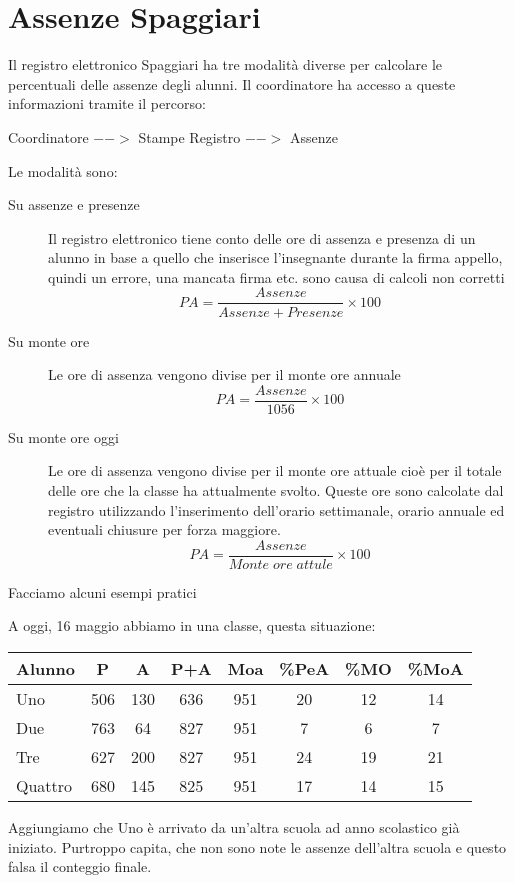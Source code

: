 \documentclass{article}
\begin{document}
\section*{Assenze Spaggiari}
Il registro elettronico Spaggiari  ha tre modalità diverse per calcolare le percentuali delle assenze degli alunni. Il coordinatore ha accesso a queste informazioni tramite il percorso:

Coordinatore $-->$ Stampe Registro $-->$ Assenze 

Le modalità sono:
\begin{description}
	\item[Su assenze e presenze] Il registro elettronico tiene conto delle ore di assenza e presenza di un alunno  in base a quello che inserisce l'insegnante durante la firma appello, quindi un errore, una mancata firma etc. sono causa di  calcoli non corretti \[PA=\dfrac{Assenze}{Assenze+Presenze}\times 100\]
	\item[Su monte ore] Le ore di assenza vengono divise per il monte ore annuale \[PA=\dfrac{Assenze}{1056}\times 100\]
	\item[Su monte ore oggi] Le ore di assenza vengono divise per il monte ore attuale cioè per il totale delle ore che la classe ha attualmente svolto. Queste ore sono calcolate dal registro utilizzando l'inserimento dell'orario settimanale, orario annuale ed eventuali chiusure per forza maggiore.   \[PA=\dfrac{Assenze}{Monte\; ore\; attule}\times 100\]
\end{description}
Facciamo alcuni esempi pratici

A oggi, 16 maggio abbiamo in una classe, questa situazione:

\begin{center}
	\begin{tabular}{|l|c|c|c|c|c|c|c|}
	\hline
Alunno	& P & A &  P+A &Moa & \%PeA & \%MO & \%MoA   \\
	\hline
Uno	& 506 & 130& 636 & 951 & 20 & 12 & 14   \\
	\hline
Due	&763  &64&827  & 951 &7  & 6 &  7  \\
	\hline
Tre	&627  &200&827  & 951 &24  & 19 &  21  \\
	\hline
Quattro	&680  &145&825  & 951 &17  & 14 &  15  \\
\hline
\end{tabular} 
\end{center}
Aggiungiamo che Uno è arrivato da un'altra scuola ad anno scolastico già iniziato. Purtroppo capita, che non sono note le assenze dell'altra scuola e questo falsa il conteggio finale.
\end{document}
